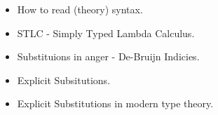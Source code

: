\begin{itemize}
  \item How to read (theory) syntax.
  \item STLC - Simply Typed Lambda Calculus.
  \item Substituions in anger - De-Bruijn Indicies.
  \item Explicit Subsitutions.
  \item Explicit Substitutions in modern type theory.
\end{itemize}
